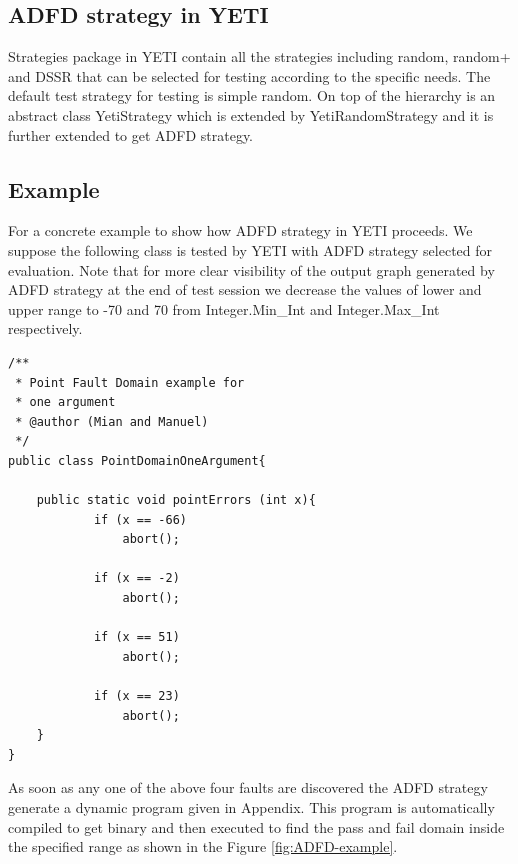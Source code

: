 \documentclass[runningheads,a4paper]{llncs}
\begin{document}
 \subsection{ADFD strategy in YETI}
Strategies package in YETI contain all the strategies including random, random+ and DSSR that can be selected for testing according to the specific needs. The default test strategy for testing is simple random. On top of the hierarchy is an abstract class YetiStrategy which is extended by YetiRandomStrategy and it is further extended to get ADFD strategy.
 

\subsection{Example}\label{sec:example}
For a concrete example to show how ADFD strategy in YETI proceeds. We suppose the following class is tested by YETI with ADFD strategy selected for evaluation. Note that for more clear visibility of the output graph generated by ADFD strategy at the end of test session we decrease the values of lower and upper range to -70 and 70 from Integer.Min\_Int and Integer.Max\_Int respectively. 


\begin{lstlisting}
/**
 * Point Fault Domain example for 
 * one argument
 * @author (Mian and Manuel)
 */
public class PointDomainOneArgument{

	public static void pointErrors (int x){
     		if (x == -66)
       			abort();
     
     		if (x == -2)
     			abort();
      				
     		if (x == 51)
     			abort();
     
     		if (x == 23)
     			abort();
	}
}
\end{lstlisting}


As soon as any one of the above four faults are discovered the ADFD strategy generate a dynamic program given in Appendix. This program is automatically compiled to get binary and then executed to find the pass and fail domain inside the specified range as shown in the Figure \ref{fig:ADFD-example}.
\end{document}
